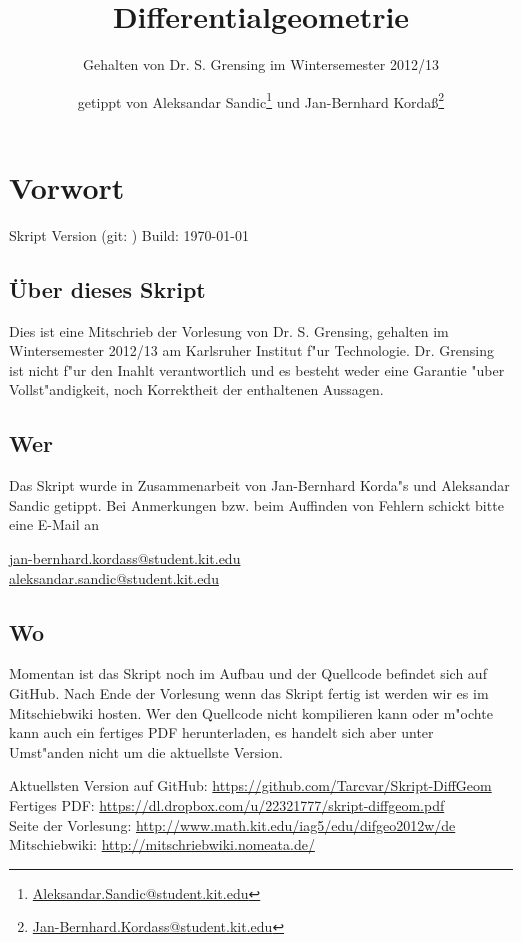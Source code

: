 \documentclass[paper=A4, twoside, chapterprefix=true, bibliography=totoc, headsepline]{scrbook}
\title{Differentialgeometrie}
\subtitle{Gehalten von Dr. S. Grensing im Wintersemester 2012/13}
\author{getippt von Aleksandar Sandic\thanks{\href{mailto:aleksandar.sandic@student.kit.edu}{Aleksandar.Sandic@student.kit.edu}} und Jan-Bernhard Korda\ss\thanks{\href{mailto:jan-bernhard.kordass@student.kit.edu}{Jan-Bernhard.Kordass@student.kit.edu}}}
\begin{document}
\maketitle

\setlength\parskip{0.6pt}
\tableofcontents

\chapter*{Vorwort}
\setlength\parskip{\smallskipamount} Skript Version \textbf{\GITVersionTag}
(git: \GITAbrHash) \quad Build: \today

\section*{\"Uber dieses Skript}
Dies ist eine Mitschrieb der Vorlesung  von Dr. S. Grensing, gehalten im Wintersemester 2012/13 am Karlsruher Institut f"ur Technologie.
Dr. Grensing ist nicht f"ur den Inahlt verantwortlich und es besteht weder eine Garantie "uber Vollst"andigkeit, noch Korrektheit der enthaltenen Aussagen.

\section*{Wer}
Das Skript wurde in Zusammenarbeit von Jan-Bernhard Korda"s und Aleksandar Sandic getippt.
Bei Anmerkungen bzw. beim Auffinden von Fehlern schickt bitte eine E-Mail an
\begin{center}
  \href{mailto:jan-bernhard.kordass@student.kit.edu}{jan-bernhard.kordass@student.kit.edu}\\
  \href{mailto:aleksandar.sandic@student.kit.edu}{aleksandar.sandic@student.kit.edu}
\end{center}

\section*{Wo}
Momentan ist das Skript noch im Aufbau und der Quellcode befindet sich auf GitHub.
Nach Ende der Vorlesung wenn das Skript fertig ist werden wir es im Mitschiebwiki hosten.
Wer den Quellcode nicht kompilieren kann oder m"ochte kann auch ein fertiges PDF herunterladen, es handelt sich aber unter Umst"anden nicht um die aktuellste Version.

Aktuellsten Version auf GitHub: \url{https://github.com/Tarcvar/Skript-DiffGeom}\\
Fertiges PDF: \url{https://dl.dropbox.com/u/22321777/skript-diffgeom.pdf}\\
Seite der Vorlesung: \url{http://www.math.kit.edu/iag5/edu/difgeo2012w/de}\\
Mitschiebwiki: \url{http://mitschriebwiki.nomeata.de/}
\end{document}
